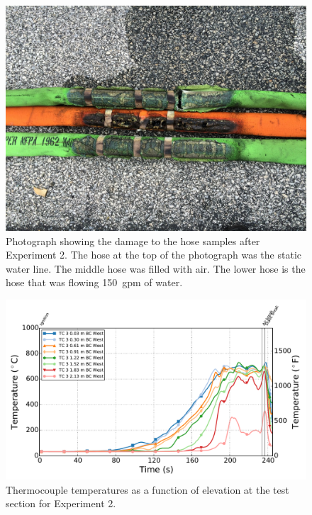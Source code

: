 \documentclass[letterpaper,11pt]{texMemo} %
\begin{document}
\begin{figure}[!ht]
\centering
\includegraphics[width=.8\columnwidth]{../Figures/Hose_Figures/hose_post_exp2}
\caption{Photograph showing the damage to the hose samples after Experiment 2. The hose at the top of the photograph was the static water line. The middle hose was filled with air. The lower hose is the hose that was flowing 150~gpm of water.}
\label{fig:post_test2_image}
\end{figure}

\begin{figure}[!ht]
\centering
\includegraphics[width=\columnwidth]{../Figures/Hose_Figures/Test_62_West_81015_TC_A3}
\caption{Thermocouple temperatures as a function of elevation at the test section for Experiment 2.}
\label{fig:temp_A3_test62}
\end{figure}
\end{document}
